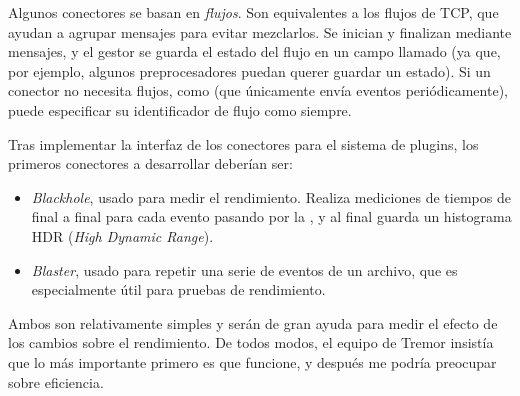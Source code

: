 Algunos conectores se basan en \emph{flujos}. Son equivalentes a los flujos de
TCP, que ayudan a agrupar mensajes para evitar mezclarlos. Se inician y
finalizan mediante mensajes, y el gestor se guarda el estado del flujo en un
campo llamado  (ya que, por ejemplo, algunos preprocesadores puedan
querer guardar un estado). Si un conector no necesita flujos, como
 (que únicamente envía eventos periódicamente), puede
especificar su identificador de flujo como  siempre.

Tras implementar la interfaz de los conectores para el sistema de plugins,
los primeros conectores a desarrollar deberían ser:

\begin{itemize}
    \item \emph{Blackhole}, usado para medir el rendimiento. Realiza mediciones
        de tiempos de final a final para cada evento pasando por la \pipeline, y
        al final guarda un histograma HDR (\emph{High Dynamic Range}).

    \item \emph{Blaster}, usado para repetir una serie de eventos de un archivo,
        que es especialmente útil para pruebas de rendimiento.

\end{itemize}

Ambos son relativamente simples y serán de gran ayuda para medir el efecto de
los cambios sobre el rendimiento. De todos modos, el equipo de Tremor insistía
que lo más importante primero es que funcione, y después me podría preocupar
sobre eficiencia.
